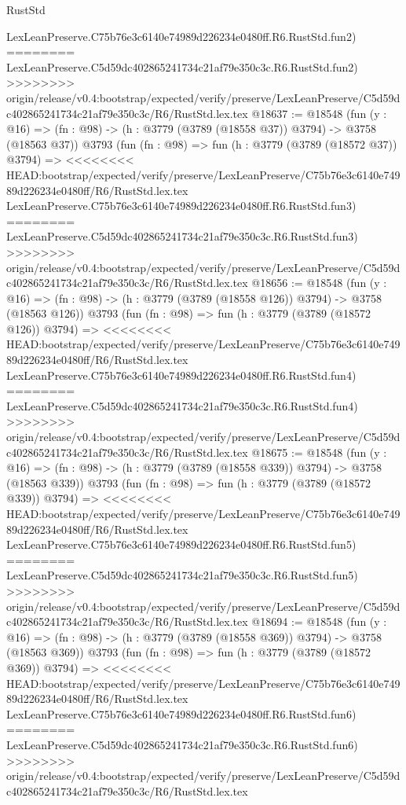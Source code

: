 \begin{lexlean}{RustStd}
\begin{coremodule}
{\begin{coremodule}
{{{{{{{{{{{{{{{{{{{{{{{{{{{{{{{    LexLeanPreserve.C75b76e3c6140e74989d226234e0480ff.R6.RustStd.fun2)
========
    LexLeanPreserve.C5d59dc402865241734c21af79e350c3c.R6.RustStd.fun2)
>>>>>>>> origin/release/v0.4:bootstrap/expected/verify/preserve/LexLeanPreserve/C5d59dc402865241734c21af79e350c3c/R6/RustStd.lex.tex
@18637 := @18548
    (fun (y : @16) => (fn : @98) -> (h : @3779 (@3789 (@18558 @37)) @3794) -> @3758 (@18563 @37))
    @3793
    (fun (fn : @98) =>
    fun (h : @3779 (@3789 (@18572 @37)) @3794) =>
<<<<<<<< HEAD:bootstrap/expected/verify/preserve/LexLeanPreserve/C75b76e3c6140e74989d226234e0480ff/R6/RustStd.lex.tex
    LexLeanPreserve.C75b76e3c6140e74989d226234e0480ff.R6.RustStd.fun3)
========
    LexLeanPreserve.C5d59dc402865241734c21af79e350c3c.R6.RustStd.fun3)
>>>>>>>> origin/release/v0.4:bootstrap/expected/verify/preserve/LexLeanPreserve/C5d59dc402865241734c21af79e350c3c/R6/RustStd.lex.tex
@18656 := @18548
    (fun (y : @16) => (fn : @98) -> (h : @3779 (@3789 (@18558 @126)) @3794) -> @3758 (@18563 @126))
    @3793
    (fun (fn : @98) =>
    fun (h : @3779 (@3789 (@18572 @126)) @3794) =>
<<<<<<<< HEAD:bootstrap/expected/verify/preserve/LexLeanPreserve/C75b76e3c6140e74989d226234e0480ff/R6/RustStd.lex.tex
    LexLeanPreserve.C75b76e3c6140e74989d226234e0480ff.R6.RustStd.fun4)
========
    LexLeanPreserve.C5d59dc402865241734c21af79e350c3c.R6.RustStd.fun4)
>>>>>>>> origin/release/v0.4:bootstrap/expected/verify/preserve/LexLeanPreserve/C5d59dc402865241734c21af79e350c3c/R6/RustStd.lex.tex
@18675 := @18548
    (fun (y : @16) => (fn : @98) -> (h : @3779 (@3789 (@18558 @339)) @3794) -> @3758 (@18563 @339))
    @3793
    (fun (fn : @98) =>
    fun (h : @3779 (@3789 (@18572 @339)) @3794) =>
<<<<<<<< HEAD:bootstrap/expected/verify/preserve/LexLeanPreserve/C75b76e3c6140e74989d226234e0480ff/R6/RustStd.lex.tex
    LexLeanPreserve.C75b76e3c6140e74989d226234e0480ff.R6.RustStd.fun5)
========
    LexLeanPreserve.C5d59dc402865241734c21af79e350c3c.R6.RustStd.fun5)
>>>>>>>> origin/release/v0.4:bootstrap/expected/verify/preserve/LexLeanPreserve/C5d59dc402865241734c21af79e350c3c/R6/RustStd.lex.tex
@18694 := @18548
    (fun (y : @16) => (fn : @98) -> (h : @3779 (@3789 (@18558 @369)) @3794) -> @3758 (@18563 @369))
    @3793
    (fun (fn : @98) =>
    fun (h : @3779 (@3789 (@18572 @369)) @3794) =>
<<<<<<<< HEAD:bootstrap/expected/verify/preserve/LexLeanPreserve/C75b76e3c6140e74989d226234e0480ff/R6/RustStd.lex.tex
    LexLeanPreserve.C75b76e3c6140e74989d226234e0480ff.R6.RustStd.fun6)
========
    LexLeanPreserve.C5d59dc402865241734c21af79e350c3c.R6.RustStd.fun6)
>>>>>>>> origin/release/v0.4:bootstrap/expected/verify/preserve/LexLeanPreserve/C5d59dc402865241734c21af79e350c3c/R6/RustStd.lex.tex
}}}}}}}}}}}}}}}}}}}}}}}}}}}}}}}
\end{coremodule}}
\end{coremodule}
\end{lexlean}
